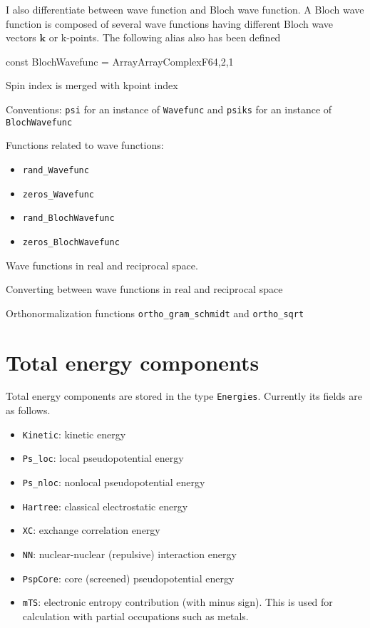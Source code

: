 \documentclass[a4paper,12pt]{article}
\newcommand{\jlcode}[1]{\texttt{#1}}
\begin{document}
I also differentiate between wave function and Bloch wave function.
A Bloch wave function is composed of several wave functions having
different Bloch wave vectors $\mathbf{k}$ or k-points.
The following alias also has been defined
\begin{juliacode}
const BlochWavefunc = Array{Array{ComplexF64,2},1}
\end{juliacode}

Spin index is merged with kpoint index

Conventions: \jlcode{psi} for an instance of \jlcode{Wavefunc} and
\jlcode{psiks} for an instance of \jlcode{BlochWavefunc}

Functions related to wave functions:
\begin{itemize}
\item \jlcode{rand_Wavefunc}
\item \jlcode{zeros_Wavefunc}
\item \jlcode{rand_BlochWavefunc}
\item \jlcode{zeros_BlochWavefunc}
\end{itemize}

Wave functions in real and reciprocal space.

Converting between wave functions in real and reciprocal space

Orthonormalization functions
\jlcode{ortho_gram_schmidt} and \jlcode{ortho_sqrt}


\section{Total energy components}

Total energy components are stored in the type \jlcode{Energies}. Currently its
fields are as follows.
\begin{itemize}
%
\item \jlcode{Kinetic}: kinetic energy
%
\item \jlcode{Ps_loc}: local pseudopotential energy
%
\item \jlcode{Ps_nloc}: nonlocal pseudopotential energy
%
\item \jlcode{Hartree}: classical electrostatic energy
%
\item \jlcode{XC}: exchange correlation energy
%
\item \jlcode{NN}: nuclear-nuclear (repulsive) interaction energy
%
\item \jlcode{PspCore}: core (screened) pseudopotential energy
%
\item \jlcode{mTS}: electronic entropy contribution (with minus sign). This is
  used for calculation with partial occupations such as metals.
%
\end{itemize}
\end{document}
